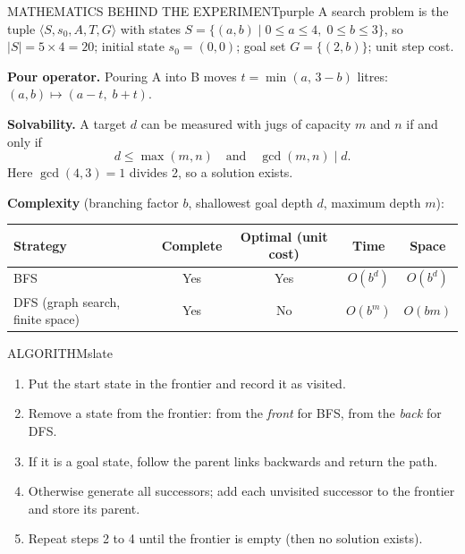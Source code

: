 \documentclass[11pt,a4paper]{article}
\newenvironment{maths}{\begin{secbox}{MATHEMATICS BEHIND THE EXPERIMENT}{purple}}{\end{secbox}}
\newenvironment{algorithm}{\begin{secbox}{ALGORITHM}{slate}}{\end{secbox}}
\begin{document}
\begin{maths}
A search problem is the tuple $\langle S, s_0, A, T, G\rangle$ with states $S=\{(a,b)\mid 0\le a\le 4,\;0\le b\le 3\}$, so $|S| = 5\times 4 = 20$; initial state $s_0=(0,0)$; goal set $G=\{(2,b)\}$; unit step cost.

\textbf{Pour operator.} Pouring A into B moves $t=\min(a,\,3-b)$ litres: $(a,b)\mapsto(a-t,\;b+t)$.

\textbf{Solvability.} A target $d$ can be measured with jugs of capacity $m$ and $n$ if and only if
\[ d \le \max(m,n)\quad\text{and}\quad \gcd(m,n)\mid d . \]
Here $\gcd(4,3)=1$ divides 2, so a solution exists.

\textbf{Complexity} (branching factor $b$, shallowest goal depth $d$, maximum depth $m$):
\begin{center}\small
\begin{tabular}{lcccc}
\toprule
Strategy & Complete & Optimal (unit cost) & Time & Space\\ \midrule
BFS & Yes & Yes & $O(b^{d})$ & $O(b^{d})$\\
DFS (graph search, finite space) & Yes & No & $O(b^{m})$ & $O(bm)$\\
\bottomrule
\end{tabular}
\end{center}
\end{maths}

\begin{algorithm}
\begin{enumerate}
  \item Put the start state in the frontier and record it as visited.
  \item Remove a state from the frontier: from the \emph{front} for BFS, from the \emph{back} for DFS.
  \item If it is a goal state, follow the parent links backwards and return the path.
  \item Otherwise generate all successors; add each unvisited successor to the frontier and store its parent.
  \item Repeat steps 2 to 4 until the frontier is empty (then no solution exists).
\end{enumerate}
\end{algorithm}
\end{document}
